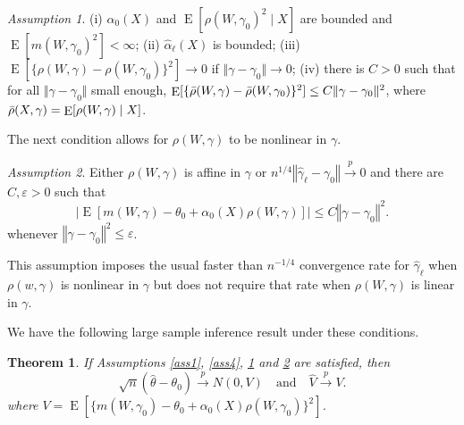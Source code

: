 \documentclass[aos]{imsart}
\numberwithin{equation}{section}
\theoremstyle{plain}
\newtheorem{theorem}{Theorem}[section]
\theoremstyle{remark}
\newtheorem{assumption}{Assumption}
\DeclareMathOperator{\E}{E}
\begin{document}
\begin{assumption}
    \label{ass5} (i)
$\alpha_0(X)$ and $\E[\rho(W, \gamma_0)^2 \mid X]$ are bounded and $\E[m(W, \gamma_0)^2] < \infty$; (ii) $\hat{\alpha}_{\ell}(X)$ is bounded; (iii) $\E[\{\rho(W, \gamma) - \rho(W, \gamma_0)\}^2] \to 0$ if $\Vert \gamma - \gamma_0\Vert \to 0$; (iv) there is $C > 0$ such that for all $\Vert \gamma - \gamma_0\Vert$ small enough, $\E[\{\Bar{\rho}(W, \gamma) - \Bar{\rho}(W, \gamma_0)\}^2] \leq C \Vert \gamma - \gamma_0\Vert^2$, where $\Bar{\rho}(X, \gamma) = \E[\rho(W, \gamma) \mid X]$.
\end{assumption}

 The next condition allows for
$\rho(W,\gamma)$ to be nonlinear in $\gamma.$

\begin{assumption}
    \label{ass6}
    Either $\rho(W,\gamma)$ is affine in
$\gamma$ or $n^{1/4}\left\Vert \hat{\gamma}_{\ell}-\gamma
_{0}\right\Vert \overset{p}{\to}0$ and there are
$C, \varepsilon >0$ such that
\[
\left\vert \E[m(W,\gamma)-\theta_{0}+\alpha_{0}(X)\rho(W,\gamma)]\right\vert
\leq C\left\Vert \gamma-\gamma_{0}\right\Vert ^{2}.
\]
whenever $\left\Vert \gamma-\gamma_{0}\right\Vert ^{2} \leq \varepsilon$.
\end{assumption}

This assumption imposes the usual faster than $n^{-1/4}$ convergence rate for $\hat{\gamma}_{\ell}$ when $\rho(w,\gamma)$ is nonlinear in $\gamma$ but does not require that rate when $\rho(W,\gamma)$ is linear in $\gamma$. 

We have the following large sample inference result under these conditions.

\begin{theorem}\label{thm2vunknown}
    If Assumptions \ref{ass1}, \ref{ass4}, \ref{ass5} and \ref{ass6} are satisfied, then
    \[
    \sqrt{n}(\hat{\theta}-\theta_{0})\overset{p}{\to}N(0,V)\quad\text{and}\quad\hat{V}\overset{p}{\to}V.
    \]
where $V=\E[\{m(W,\gamma_{0})-\theta_{0}+\alpha_{0}(X)\rho(W, \gamma_0)\}^{2}]$.
\end{theorem}
\end{document}
